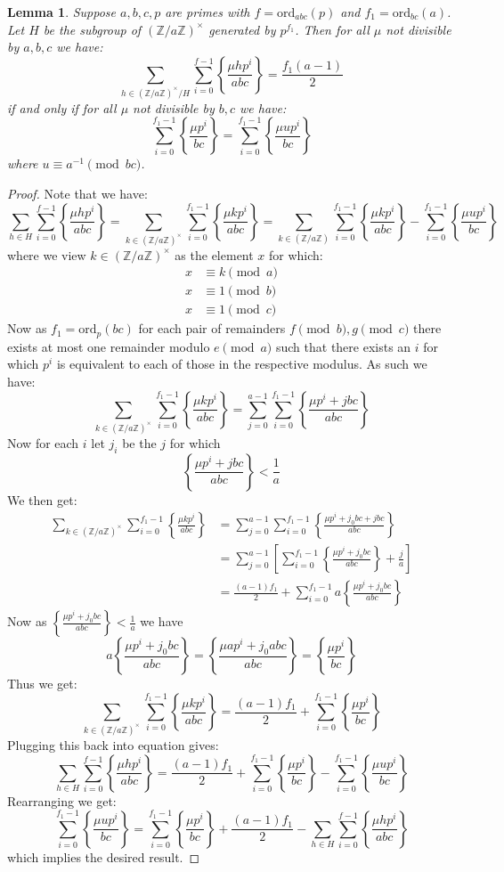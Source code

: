 \documentclass{article}
\newcommand{\Z}{\mathbb{Z}}
\newcommand{\ord}[0]{\mathrm{ord}}
\newcommand{\frp}[2]{\left\{\frac{#1}{#2}\right\}}
\newtheorem{lemma}[theorem]{Lemma}
\theoremstyle{definition}
\theoremstyle{definition}
\theoremstyle{remark}
\begin{document}
\begin{lemma}
\label{thm:partial_sum_abc_to_bc}
Suppose $a,b,c,p$ are primes with $f = \ord_{abc}(p)$ and $f_1 = \ord_{bc}(a)$. Let $H$ be the subgroup of $(\Z/a\Z)^{\times}$ generated by $p^{f_1}$. Then for all $\mu$ not divisible by $a,b,c$ we have:
\[\sum_{h \in (\Z/a\Z)^{\times}/H} \sum_{i = 0}^{f-1} \frp{\mu hp^i}{abc} = \frac{f_1(a-1)}{2}\]
if and only if for all $\mu$ not divisible by $b,c$ we have:
\[\sum_{i = 0}^{f_1-1} \frp{\mu p^i}{bc} = \sum_{i = 0}^{f_1-1} \frp{\mu up^i}{bc}\]
where $u \equiv a^{-1} \pmod{bc}$.
\end{lemma}
\begin{proof}
Note that we have:
\begin{equation} \label{eq:sum_abc_to_bc} \sum_{h \in H} \sum_{i = 0}^{f-1} \frp{\mu hp^i}{abc} = \sum_{k \in (\Z/a\Z)^{\times}} \sum_{i = 0}^{f_1 - 1} \frp{\mu kp^i}{abc} =  \sum_{k \in (\Z/a\Z)} \sum_{i = 0}^{f_1 - 1} \frp{\mu kp^i}{abc} - \sum_{i = 0}^{f_1 - 1} \frp{\mu up^i}{bc} \end{equation}
where we view $k \in (\Z/a\Z)^{\times}$ as the element $x$ for which:
\begin{align*} x &\equiv k \pmod{a} \\
 x &\equiv 1 \pmod{b} \\
 x &\equiv 1 \pmod{c}
\end{align*}
Now as $f_1 = \ord_{p}(bc)$ for each pair of remainders $f \pmod{b}, g\pmod{c}$ there exists at most one remainder modulo $e \pmod{a}$ such that there exists an $i$ for which $p^i$ is equivalent to each of those in the respective modulus. As such we have:
\[\sum_{k \in (\Z/a\Z)^{\times}} \sum_{i = 0}^{f_1 - 1} \frp{\mu kp^i}{abc} = \sum_{j = 0}^{a-1} \sum_{i = 0}^{f_1 - 1} \frp{\mu p^i + jbc}{abc}\]
Now for each $i$ let $j_i$ be the $j$ for which
\[\frp{\mu p^i + jbc}{abc} < \frac{1}{a}\]
We then get:
\begin{align*}
\sum_{k \in (\Z/a\Z)^{\times}} \sum_{i = 0}^{f_1 - 1} \frp{\mu kp^i}{abc} &= \sum_{j = 0}^{a-1} \sum_{i = 0}^{f_1 - 1} \frp{\mu p^i + j_0bc + jbc}{abc} \\
&= \sum_{j = 0}^{a-1} \left[\sum_{i = 0}^{f_1 - 1} \frp{\mu p^i + j_0bc}{abc} + \frac{j}{a}\right] \\
&= \frac{(a-1)f_1}{2} +  \sum_{i = 0}^{f_1 - 1} a\frp{\mu p^i + j_0bc}{abc} 
\end{align*}
Now as $\frp{\mu p^i + j_0bc}{abc} < \frac{1}{a}$ we have
\[a\frp{\mu p^i + j_0bc}{abc}  = \frp{\mu a p^i +j_0abc}{abc} =  \frp{\mu p^i}{bc}\]
Thus we get:
\[\sum_{k \in (\Z/a\Z)^{\times}} \sum_{i = 0}^{f_1 - 1} \frp{\mu kp^i}{abc} = \frac{(a-1)f_1}{2} +  \sum_{i = 0}^{f_1 - 1}  \frp{\mu p^i}{bc} \]
Plugging this back into equation \label{eq:sum_abc_to_bc} gives:
\[\sum_{h \in H} \sum_{i = 0}^{f-1} \frp{\mu hp^i}{abc} =  \frac{(a-1)f_1}{2} +  \sum_{i = 0}^{f_1 - 1}  \frp{\mu p^i}{bc} - \sum_{i = 0}^{f_1 - 1} \frp{\mu u p^i}{bc}\]
Rearranging we get:
\[ \sum_{i = 0}^{f_1 - 1} \frp{\mu u p^i}{bc}=   \sum_{i = 0}^{f_1 - 1}  \frp{\mu p^i}{bc} +  \frac{(a-1)f_1}{2} - \sum_{h \in H} \sum_{i = 0}^{f-1} \frp{\mu hp^i}{abc}\]
which implies the desired result.
\end{proof}
\end{document}
